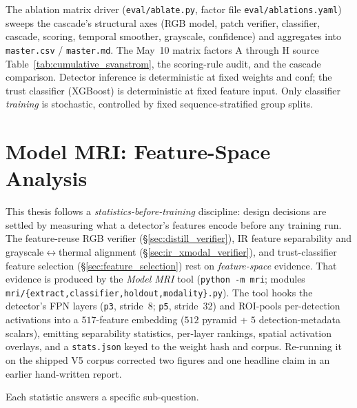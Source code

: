 The ablation matrix driver (\texttt{eval/ablate.py}, factor file \texttt{eval/ablations.yaml}) sweeps the cascade's structural axes (RGB model, patch verifier, classifier, cascade, scoring, temporal smoother, grayscale, confidence) and aggregates into \texttt{master.csv} / \texttt{master.md}. The May~10 matrix factors A through H source Table~\ref{tab:cumulative_svanstrom}, the scoring-rule audit, and the cascade comparison. Detector inference is deterministic at fixed weights and conf; the trust classifier (XGBoost) is deterministic at fixed feature input. Only classifier \emph{training} is stochastic, controlled by fixed sequence-stratified group splits.

\section{Model MRI: Feature-Space Analysis}
\label{sec:model_mri}

This thesis follows a \emph{statistics-before-training} discipline: design decisions are settled by measuring what a detector's features encode before any training run. The feature-reuse RGB verifier (\S\ref{sec:distill_verifier}), IR feature separability and grayscale$\leftrightarrow$thermal alignment (\S\ref{sec:ir_xmodal_verifier}), and trust-classifier feature selection (\S\ref{sec:feature_selection}) rest on \emph{feature-space} evidence. That evidence is produced by the \emph{Model MRI} tool (\texttt{python -m mri}; modules \texttt{mri/\{extract,classifier,holdout,modality\}.py}). The tool hooks the detector's FPN layers (\texttt{p3}, stride~8; \texttt{p5}, stride~32) and ROI-pools per-detection activations into a $517$-feature embedding ($512$ pyramid + $5$ detection-metadata scalars), emitting separability statistics, per-layer rankings, spatial activation overlays, and a \texttt{stats.json} keyed to the weight hash and corpus. Re-running it on the shipped V5 corpus corrected two figures and one headline claim in an earlier hand-written report.

Each statistic answers a specific sub-question.

